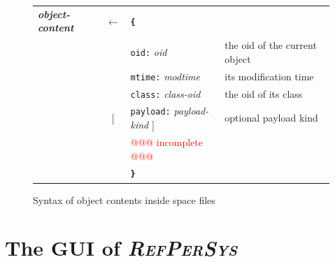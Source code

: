 \documentclass[11pt,a4paper,svgnames]{article}
\newcommand{\RefPerSys}{{\textit{\textsc{RefPerSys}}}}
\begin{document}

\begin{figure}[h]
  \begin {center}
    \begin{tabular}{lcll}
      \emph{\textbf{object-content}} & $\leftarrow$ & \textbf{\texttt{\{}} \\
      ~ & ~ & \texttt{oid:} \textit{oid} & the oid of the current object \\
      ~ & ~ & \texttt{mtime:} \textit{modtime} & its modification time  \\
      ~ & ~ & \texttt{class:} \textit{class-oid} & the oid of its class  \\
      ~ & $[$ & \texttt{payload:} \textit{payload-kind} $]$ & optional payload kind \\
      ~ & ~ & \textcolor{red}{@@@ incomplete @@@} \\
      ~ & ~ & \textbf{\texttt{\}}}
    \end{tabular}
  \end {center}
  \caption {Syntax of object contents inside space files}
\label{fig:hjson-object-contents}
  
\end{figure}


\section{The GUI of \RefPerSys}
\label{sec:gui}
\end{document}
